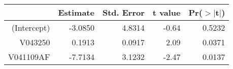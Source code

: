\begin{table}[ht]
\centering
\begin{tabular}{rrrrr}
  \hline
 & Estimate & Std. Error & t value & Pr($>$$|$t$|$) \\ 
  \hline
(Intercept) & -3.0850 & 4.8314 & -0.64 & 0.5232 \\ 
  V043250 & 0.1913 & 0.0917 & 2.09 & 0.0371 \\ 
  V041109AF & -7.7134 & 3.1232 & -2.47 & 0.0137 \\ 
   \hline
\end{tabular}
\end{table}